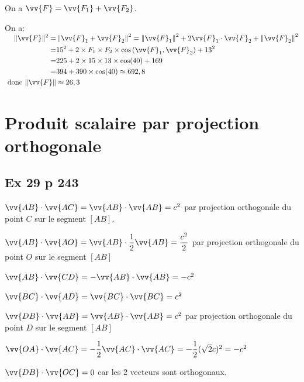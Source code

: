 \documentclass[12pt,a4paper]{book}
\begin{document}
\begin{enumMet}
    \item On a $ \vv{F}=\vv{F_{1}}+\vv{F_{2}}$.
    \item On a:\\
$\begin{aligned}\|\vv{F}\|^{2}=&\left\|\vv{F}_{1}+\vv{F}_{2}\right\|^{2}=\left\|\vv{F}_{1}\right\|^{2}+2 \vv{F}_{1} \cdot \vv{F}_{2}+\left\|\vv{F}_{2}\right\|^{2} \\=& 15^{2}+2 \times F_{1} \times F_{2} \times \cos \left(\vv{F}_{1}, \vv{F}_{2}\right)+13^{2} \\=& 225+2 \times 15 \times 13 \times \cos (40)+169 \\=& 394+390 \times \cos (40) \approx 692,8 \\ \text { donc }\| \vv{F}\| & \approx 26,3 \end{aligned}$
\end{enumMet}

\section*{Produit scalaire par projection orthogonale}

\subsection*{Ex 29 p 243}

\begin{enumMet}
    \item $\vv{A B} \cdot \vv{A C}=\vv{A B} \cdot \vv{A B}=c^{2}$ par projection orthogonale du point $C$ sur le segment $[A B]$.
    \item $\vv{A B} \cdot \vv{A O}=\vv{A B} \cdot \dfrac{1}{2} \vv{A B}=\dfrac{c^{2}}{2}$ par projection orthogonale du point $O$ sur le segment $[A B]$
    \item $\vv{A B} \cdot \vv{C D}=-\vv{A B} \cdot \vv{A B}=-c^{2}$
    \item $\vv{B C} \cdot \vv{A D}=\vv{B C} \cdot \vv{B C}=c^{2}$
    \item $\vv{D B} \cdot \vv{A B}=\vv{A B} \cdot \vv{A B}=c^{2}$ par projection orthogonale du point $D$ sur le segment $[A B]$
    \item $\vv{O A} \cdot \vv{A C}=-\dfrac{1}{2} \vv{A C} \cdot \vv{A C}=-\dfrac{1}{2}(\sqrt{2} c)^{2}=-c^{2}$
    \item $\vv{DB} \cdot \vv{OC}=0$ car les 2 vecteurs sont orthogonaux.
\end{enumMet}
\end{document}
